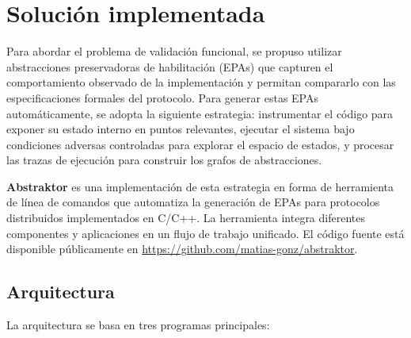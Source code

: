 \documentclass[12pt]{article}
\begin{document}
\bigskip

\section{Solución implementada}

Para abordar el problema de validación funcional, se propuso utilizar abstracciones preservadoras de habilitación (EPAs) que capturen el comportamiento observado de la implementación y permitan compararlo con las especificaciones formales del protocolo. Para generar estas EPAs automáticamente, se adopta la siguiente estrategia: instrumentar el código para exponer su estado interno en puntos relevantes, ejecutar el sistema bajo condiciones adversas controladas para explorar el espacio de estados, y procesar las trazas de ejecución para construir los grafos de abstracciones.

\textbf{Abstraktor} es una implementación de esta estrategia en forma de herramienta de línea de comandos que automatiza la generación de EPAs para protocolos distribuidos implementados en C/C++. La herramienta integra diferentes componentes y aplicaciones en un flujo de trabajo unificado. El código fuente está disponible públicamente en \url{https://github.com/matias-gonz/abstraktor}.


\subsection{Arquitectura}

La arquitectura se basa en tres programas principales:

\vspace{0.5cm}
\end{document}
